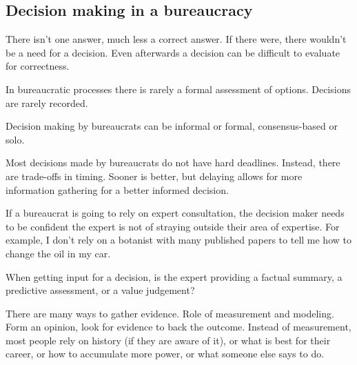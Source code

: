 \subsection{Decision making in a bureaucracy}

There isn't one answer, much less a correct answer. If there were, there wouldn't be a need for a decision. Even afterwards a decision can be difficult to evaluate for correctness.

In bureaucratic processes there is rarely a formal assessment of options. 
Decisions are rarely recorded. 

Decision making by bureaucrats can be informal or formal, consensus-based or solo. 

Most decisions made by bureaucrats do not have hard deadlines. Instead, there are trade-offs in timing. Sooner is better, but delaying allows for more information gathering for a better informed decision.


If a bureaucrat is going to rely on expert consultation, the decision maker needs to be confident the expert is not of straying outside their area of expertise. For example, I don't rely on a botanist with many published papers to tell me how to change the oil in my car. 

When getting input for a decision, is the expert providing a factual summary, a predictive assessment, or a value judgement? 

There are many ways to gather evidence. 
Role of measurement and modeling. 
Form an opinion, look for evidence to back the outcome.
Instead of measurement, most people rely on history (if they are aware of it), or what is best for their career, or how to accumulate more power, or what someone else says to do.  